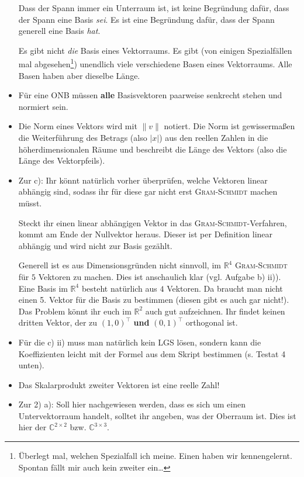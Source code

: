 \documentclass[11pt, a4paper]{article}
\newcommand{\R}{\mathbb{R}}
\newcommand{\C}{\mathbb{C}}
\begin{document}
\begin{itemize}
Dass der Spann immer ein Unterraum ist, ist keine Begründung dafür, dass der Spann eine Basis \emph{sei}. Es ist eine Begründung dafür, dass der Spann generell eine Basis \emph{hat}. 

Es gibt nicht \emph{die} Basis eines Vektorraums. Es gibt (von einigen Spezialfällen mal abgesehen\footnote{Überlegt mal, welchen Spezialfall ich meine. Einen haben wir kennengelernt. Spontan fällt mir auch kein zweiter ein\dots \smiley{}}) unendlich viele verschiedene Basen eines Vektorraums. Alle Basen haben aber dieselbe Länge.

\item Für eine ONB müssen \textbf{alle} Basisvektoren paarweise senkrecht stehen und normiert sein.

\item Die Norm eines Vektors wird mit $\|v\|$ notiert. Die Norm ist gewissermaßen die Weiterführung des Betrags (also $|x|$) aus den reellen Zahlen in die höherdimensionalen Räume und beschreibt die Länge des Vektors (also die Länge des Vektorpfeils).

\item Zur c): Ihr könnt natürlich vorher überprüfen, welche Vektoren linear abhängig sind, sodass ihr für diese gar nicht erst \textsc{Gram-Schmidt} machen müsst.

Steckt ihr einen linear abhängigen Vektor in das \textsc{Gram-Schmidt}-Verfahren, kommt am Ende der Nullvektor heraus. Dieser ist per Definition linear abhängig und wird nicht zur Basis gezählt.

Generell ist es aus Dimensionsgründen nicht sinnvoll, im $\R^4$ \textsc{Gram-Schmidt} für $5$ Vektoren zu machen. Dies ist anschaulich klar (vgl. Aufgabe b) ii)). Eine Basis im $\R^4$ besteht natürlich aus $4$ Vektoren. Da braucht man nicht einen 5. Vektor für die Basis zu bestimmen (diesen gibt es auch gar nicht!). Das Problem könnt ihr euch im $\R^2$ auch gut aufzeichnen. Ihr findet keinen dritten Vektor, der zu $(1, 0)^\intercal$ \textbf{und} $(0, 1)^\intercal$ orthogonal ist.

\item Für die c) ii) muss man natürlich kein LGS lösen, sondern kann die Koeffizienten leicht mit der Formel aus dem Skript bestimmen (s. Testat 4 unten).

\item Das Skalarprodukt zweiter Vektoren ist eine reelle Zahl!

\item Zur 2) a): Soll hier nachgewiesen werden, dass es sich um einen Untervektorraum handelt, solltet ihr angeben, was der Oberraum ist. Dies ist hier der $\C^{2 \times 2}$ bzw. $\C^{3 \times 3}$.


\end{itemize}
\end{document}

